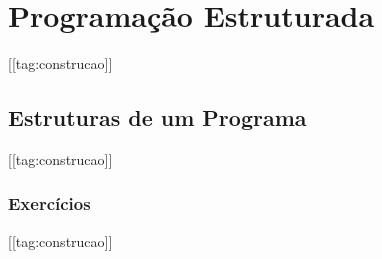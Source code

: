 
\chapter{Programação Estruturada}\label{cap_progest}
\thispagestyle{fancy}

[[tag:construcao]]

\section{Estruturas de um Programa}\label{cap_progest_sec_est}

[[tag:construcao]]

\subsection{Exercícios}

[[tag:construcao]]